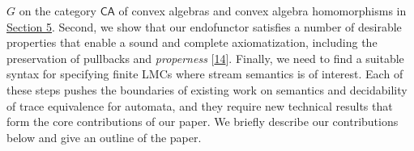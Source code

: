 \documentclass[11pt,a4paper]{amsart}
\begin{document}
\hypertarget{html:S1.p5.m1}{}\({G}\) on the category %
\hypertarget{html:S1.p5.m2}{}\({\mathsf{CA}}\) of convex algebras and convex algebra homomorphisms in \hyperlink{html:S5}{Section 5}. Second, we show that our endofunctor satisfies a number of desirable properties that enable a sound and complete axiomatization, including the preservation of pullbacks and \emph{properness} [\hyperlink{html:bib.bib14}{14}]. Finally, we need to find a suitable syntax for specifying finite LMCs where stream semantics is of interest. Each of these steps pushes the boundaries of existing work on semantics and decidability of trace equivalence for automata, and they require new technical results that form the core contributions of our paper. We briefly describe our contributions below and give an outline of the paper.
\par\medskip
\hypertarget{html:S1.I1}{}
\end{document}
